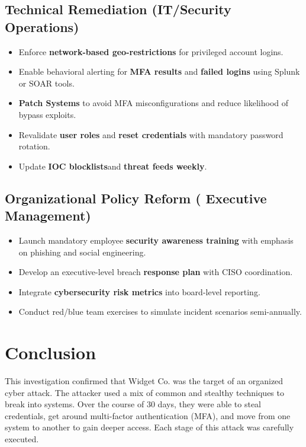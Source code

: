 \documentclass[11pt]{article}
\begin{document}
	\subsection{Technical Remediation (IT/Security Operations)}
	\begin{itemize}
		\item Enforce \textbf{network-based geo-restrictions} for privileged account logins.
		\item Enable behavioral alerting for \textbf{MFA results} and \textbf{failed logins} using Splunk or SOAR tools.
		\item \textbf{Patch Systems} to avoid MFA misconfigurations and reduce likelihood of bypass exploits.
		\item Revalidate \textbf{user roles} and \textbf{reset credentials} with mandatory password rotation.
		\item Update \textbf{IOC blocklists}and \textbf{threat feeds weekly}.
	\end{itemize}
	
	\subsection{Organizational Policy Reform ( Executive Management)}
	\begin{itemize}
		\item Launch mandatory employee \textbf{security awareness training} with emphasis on phishing and social engineering.
		\item Develop an executive-level breach \textbf{response plan} with CISO coordination.
		\item Integrate \textbf{cybersecurity risk metrics} into board-level reporting.
		\item Conduct red/blue team exercises to simulate incident scenarios semi-annually.
	\end{itemize}
	
	\newpage
	\section{Conclusion}
	
	\hspace{1.5em} This investigation confirmed that Widget Co. was the target of an organized cyber attack. The attacker used a mix of common and stealthy techniques to break into systems. Over the course of 30 days, they were able to steal credentials, get around multi-factor authentication (MFA), and move from one system to another to gain deeper access. Each stage of this attack was carefully executed.
	
\end{document}
